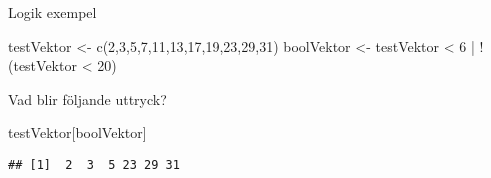 \documentclass[
  10pt,
  ignorenonframetext,
]{beamer}
\newenvironment{Shaded}{\begin{snugshade}}{\end{snugshade}}
\newcommand{\DecValTok}[1]{\textcolor[rgb]{0.00,0.00,0.81}{#1}}
\newcommand{\FunctionTok}[1]{\textcolor[rgb]{0.00,0.00,0.00}{#1}}
\newcommand{\NormalTok}[1]{#1}
\newcommand{\OtherTok}[1]{\textcolor[rgb]{0.56,0.35,0.01}{#1}}
\newcommand{\SpecialCharTok}[1]{\textcolor[rgb]{0.00,0.00,0.00}{#1}}
\begin{document}
\begin{frame}[fragile]{Logik exempel}
\protect\hypertarget{logik-exempel}{}
\begin{Shaded}
\begin{Highlighting}[]
\NormalTok{testVektor }\OtherTok{\textless{}{-}} \FunctionTok{c}\NormalTok{(}\DecValTok{2}\NormalTok{,}\DecValTok{3}\NormalTok{,}\DecValTok{5}\NormalTok{,}\DecValTok{7}\NormalTok{,}\DecValTok{11}\NormalTok{,}\DecValTok{13}\NormalTok{,}\DecValTok{17}\NormalTok{,}\DecValTok{19}\NormalTok{,}\DecValTok{23}\NormalTok{,}\DecValTok{29}\NormalTok{,}\DecValTok{31}\NormalTok{)}
\NormalTok{boolVektor }\OtherTok{\textless{}{-}}\NormalTok{ testVektor }\SpecialCharTok{\textless{}} \DecValTok{6} \SpecialCharTok{|} \SpecialCharTok{!}\NormalTok{(testVektor }\SpecialCharTok{\textless{}} \DecValTok{20}\NormalTok{)}
\end{Highlighting}
\end{Shaded}

Vad blir följande uttryck?

\begin{Shaded}
\begin{Highlighting}[]
\NormalTok{testVektor[boolVektor]}
\end{Highlighting}
\end{Shaded}

\pause

\begin{verbatim}
## [1]  2  3  5 23 29 31
\end{verbatim}
\end{frame}
\end{document}
